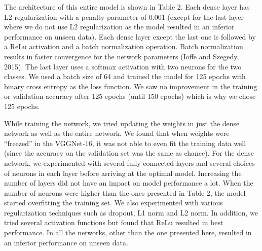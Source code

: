 \documentclass[11pt]{article}
\begin{document}
The architecture of this entire model is shown in  Table 2. Each dense layer has L2 regularization with a penalty parameter of 0.001 (except for the last layer where we do not use L2 regularization as the model resulted in an inferior performance on unseen data). Each dense layer except the last one is followed by a ReLu activation and a batch normalization operation. Batch normalization results in faster convergence for the network parameters (Ioffe and Szegedy, 2015). The last layer uses a softmax activation with two neurons for the two classes. We used a batch size of 64 and trained the model for 125 epochs with binary cross entropy as the loss function. We saw no improvement in the training or validation accuracy after 125 epochs (until 150 epochs) which is why we chose 125 epochs.

While training the network, we tried updating the weights in just the dense network as well as the entire network. We found that when weights were “freezed” in the VGGNet-16, it was not able to even fit the training data well (since the accuracy on the validation set was the same as chance). For the dense network, we experimented with several fully connected layers and several choices of neurons in each layer before arriving at the optimal model. Increasing the number of layers did not have an impact on model performance a lot. When the number of neurons were higher than the ones presented in Table 2, the model started overfitting the training set. We also experimented with various regularization techniques such as dropout, L1 norm and L2 norm. In addition, we tried several activation functions but found that ReLu resulted in best performance. In all the networks, other than the one presented here,  resulted in an inferior performance on unseen data.
\end{document}

